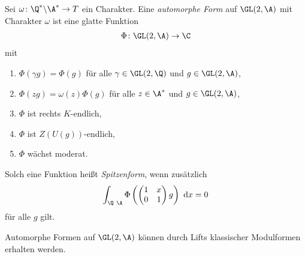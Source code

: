 \begin{defi}
Sei $\omega\colon \Q^\ast \backslash \A^\ast \to T$ ein Charakter.
Eine \emph{automorphe Form} auf $\GL(2,\A)$ mit Charakter $\omega$ ist eine glatte Funktion
\begin{align*}
\Phi \colon \GL(2,\A) \to \C
\end{align*}
mit
\begin{enumerate}[label=(\roman*)]
\item $\Phi(\gamma g)=\Phi(g)$ für alle $\gamma \in \GL(2,\Q)$ und $g \in \GL(2,\A)$,
\item $\Phi(zg)=\omega(z)\Phi(g)$ für alle $z \in \A^\ast$ und $g \in \GL(2,\A)$,
\item $\Phi$ ist rechts $K$-endlich,
\item $\Phi$ ist $Z(U(g))$-endlich,
\item $\Phi$ wächst moderat.
\end{enumerate}
Solch eine Funktion heißt \emph{Spitzenform}, wenn zusätzlich
\begin{align*}
\int_{\Q\ \A} \Phi \left( \begin{pmatrix}
1 &x\\
0 &1
\end{pmatrix}
g\right) ~\mathrm{d}x=0
\end{align*}
für alle $g$ gilt.
\end{defi}

\begin{bem}
Automorphe Formen auf $\GL(2,\A)$ können durch Lifts klassischer Modulformen erhalten werden.
\end{bem}